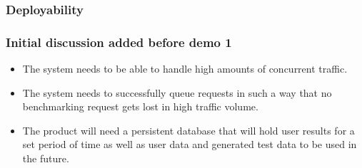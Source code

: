 \subsubsection{Deployability}
\label{sec:systemDeployability}


\subsubsection{Initial discussion added before demo 1}
\begin{itemize}
 \item The system needs to be able to handle high amounts of concurrent traffic.
 \item The system needs to successfully queue requests in such a way that no
	   benchmarking request gets lost in high traffic volume.
 \item The product will need a persistent database that will hold user results
       for a set period of time as well as user data and generated test data to
       be used in the future. 
\end{itemize}
